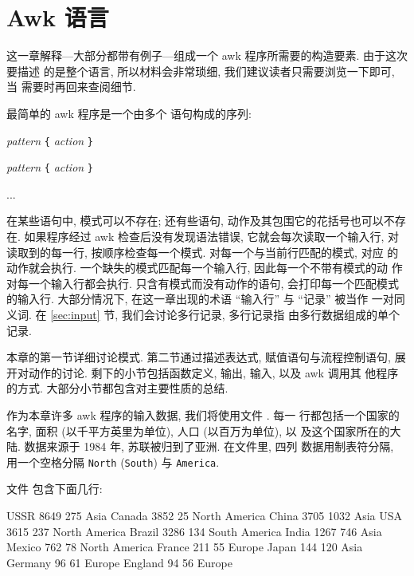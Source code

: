 
\chapter{Awk 语言}
\label{chap:the_awk_language}

这一章解释---大部分都带有例子---组成一个 awk 程序所需要的构造要素.
由于这次要描述
的是整个语言, 所以材料会非常琐细, 我们建议读者只需要浏览一下即可, 当
需要时再回来查阅细节.

最简单的 awk 程序是一个由多个 \patact 语句构成的序列:
\begin{pattern}
\textit{pattern} \texttt{\{} \textit{action} \texttt{\}} \par
\textit{pattern} \texttt{\{} \textit{action} \texttt{\}} \par
...
\end{pattern}
在某些语句中, 模式可以不存在; 还有些语句, 动作及其包围它的花括号也可以不存
在. 如果程序经过 awk 检查后没有发现语法错误, 它就会每次读取一个输入行,
对读取到的每一行, 按顺序检查每一个模式. 对每一个与当前行匹配的模式, 对应
的动作就会执行. 一个缺失的模式匹配每一个输入行, 因此每一个不带有模式的动
作对每一个输入行都会执行. 只含有模式而没有动作的语句, 会打印每一个匹配模式
的输入行. 大部分情况下, 在这一章出现的术语 ``输入行'' 与 ``记录'' 被当作
一对同义词. 在 \ref{sec:input} 节, 我们会讨论多行记录, 多行记录指
由多行数据组成的单个记录.

本章的第一节详细讨论模式. 第二节通过描述表达式, 赋值语句与流程控制语句,
展开对动作的讨论. 剩下的小节包括函数定义, 输出, 输入, 以及 awk 调用其
他程序的方式. 大部分小节都包含对主要性质的总结.


作为本章许多 awk 程序的输入数据, 我们将使用文件 . 每一
行都包括一个国家的名字, 面积 (以千平方英里为单位), 人口 (以百万为单位), 以
及这个国家所在的大陆. 数据来源于 1984 年, 苏联被归到了亚洲. 在文件里, 四列
数据用制表符分隔, 用一个空格分隔 \texttt{North} (\texttt{South}) 与
\texttt{America}.

文件  包含下面几行:
\begin{awkcode}
    USSR        8649    275     Asia
    Canada      3852    25      North America
    China       3705    1032    Asia
    USA         3615    237     North America
    Brazil      3286    134     South America
    India       1267    746     Asia
    Mexico      762     78      North America
    France      211     55      Europe
    Japan       144     120     Asia
    Germany     96      61      Europe
    England     94      56      Europe
\end{awkcode}

